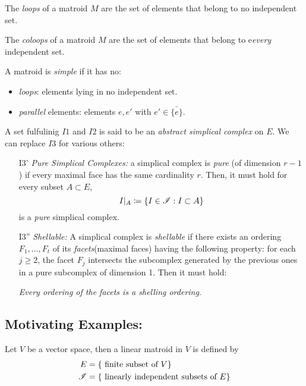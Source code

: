 \begin{definition}
    The \textit{loops} of a matroid $M$ are the set of elements that belong to no independent set.

    The \textit{coloops} of a matroid $M$ are the set of elements that belong to e\textit{every} independent set.
\end{definition}

\begin{definition}
    A matroid is \textit{simple} if it has no:
    \begin{itemize}
        \item \textit{loops}: elements lying in no independent set.
        \item \textit{parallel} elements: elements $e, e'$ with $e' \in \bar{\{ e \}}$.
    \end{itemize}
\end{definition}

\begin{definition}
    A set fulfulinig $I1$ and $I2$ is said to be an \textit{abstract simplical complex} on $E$.
    We can replace $I3$ for various others:
    \begin{enumerate}
        \item[I3'] \textit{Pure Simplical Complexes:} a simplical complex is \textit{pure} (of dimension $r-1$) if every maximal face has the same cardinality $r$.
            Then, it must hold for every subset $A \subset E$,
            $$I|_A \coloneqq \{ I \in \mathscr{I} : I \subset A \}$$
            is a \textit{pure} simplical complex.
        \item[I3''] \textit{Shellable:} A simplical complex is \textit{shellable} if there exists an ordering $F_1, \dots, F_t$ of its \textit{facets}(maximal faces) having the following property: for each $j \geq 2$, the facet $F_j$ intersects the subcomplex generated by the previous ones in  a pure subcomplex of dimension 1.
            Then it must hold:

            \textit{Every ordering of the facets is a shelling ordering}.
    \end{enumerate}
\end{definition}

\subsection{Motivating Examples:}

\begin{definition}
    Let $V$ be a vector space, then a linear matroid in $V$ is defined by
    \begin{equation*}
        \begin{split}
            E & = \lbrace \text{ finite subset of } V \rbrace \\
            \mathscr{I} & = \lbrace \text{ linearly independent subsets of } E \rbrace
        \end{split}
    \end{equation*}
\end{definition}

